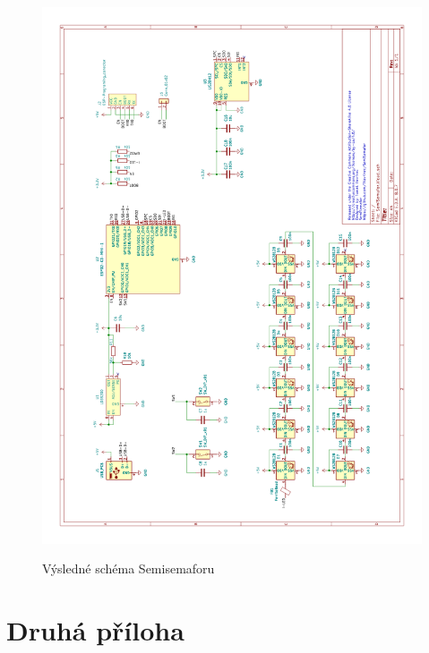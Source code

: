 \begin{figure}[!h]
	\vspace{-10mm}
	\hspace{-20mm}
	\begin{minipage}{1.0\textwidth}
	  \includegraphics[width=1.2\textwidth]{text/PraktickaCast/img/Semisemafor-SCH-V2.png}
	  \label{Semisemafor-sch-v2}
	\end{minipage}
	\vspace{-10mm}
	\caption{Výsledné schéma Semisemaforu}
\end{figure}
  
\chapter{Druhá příloha}


